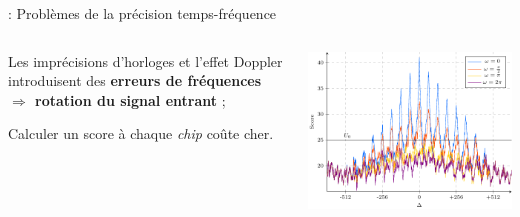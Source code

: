 \documentclass[../main.tex]{subfiles}
\begin{document}
\begin{frame}{\subsecname : {Problèmes de la précision temps-fréquence}}
  \begin{columns}
    \begin{column}{.4\linewidth}
      \begin{ctrlitemize}{8pt}
        \item Les imprécisions d'horloges et l'effet Doppler introduisent des \textbf{erreurs de fréquences} \textbf{$\Rightarrow$ rotation du signal entrant} ;
        \item Calculer un score à chaque \textit{chip} coûte cher.
      \end{ctrlitemize}
    \end{column}
    \begin{column}{.6\linewidth}
      \centering
      \includegraphics[width=\linewidth, height=.75\textheight, keepaspectratio=true]{figures/pgfplots/score_function_stdl.pdf}
    \end{column}
  \end{columns}
\end{frame}
\end{document}

